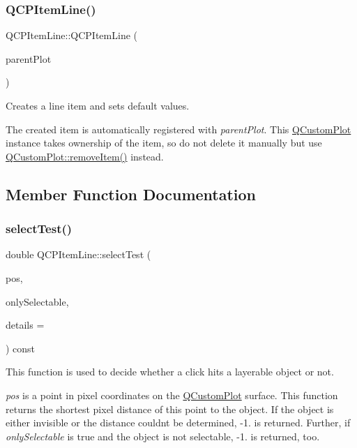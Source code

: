 \subsubsection{\texorpdfstring{Q\+C\+P\+Item\+Line()}{QCPItemLine()}}
{\footnotesize\ttfamily Q\+C\+P\+Item\+Line\+::\+Q\+C\+P\+Item\+Line (\begin{DoxyParamCaption}\item[{\hyperlink{class_q_custom_plot}{Q\+Custom\+Plot} $\ast$}]{parent\+Plot }\end{DoxyParamCaption})\hspace{0.3cm}{\ttfamily [explicit]}}

Creates a line item and sets default values.

The created item is automatically registered with {\itshape parent\+Plot}. This \hyperlink{class_q_custom_plot}{Q\+Custom\+Plot} instance takes ownership of the item, so do not delete it manually but use \hyperlink{class_q_custom_plot_ae04446557292551e8fb6e2c106e1848d}{Q\+Custom\+Plot\+::remove\+Item()} instead. 

\subsection{Member Function Documentation}
\mbox{\label{class_q_c_p_item_line_a8e02bfbca04fbcf3dbc375a2bf693229}} 
\subsubsection{\texorpdfstring{select\+Test()}{selectTest()}\hspace{0.1cm}{\footnotesize\ttfamily [1/2]}}
{\footnotesize\ttfamily double Q\+C\+P\+Item\+Line\+::select\+Test (\begin{DoxyParamCaption}\item[{const Q\+PointF \&}]{pos,  }\item[{bool}]{only\+Selectable,  }\item[{Q\+Variant $\ast$}]{details = {} }\end{DoxyParamCaption}) const\hspace{0.3cm}{\ttfamily [virtual]}}

This function is used to decide whether a click hits a layerable object or not.

{\itshape pos} is a point in pixel coordinates on the \hyperlink{class_q_custom_plot}{Q\+Custom\+Plot} surface. This function returns the shortest pixel distance of this point to the object. If the object is either invisible or the distance couldn\textquotesingle{}t be determined, -\/1. is returned. Further, if {\itshape only\+Selectable} is true and the object is not selectable, -\/1. is returned, too.

